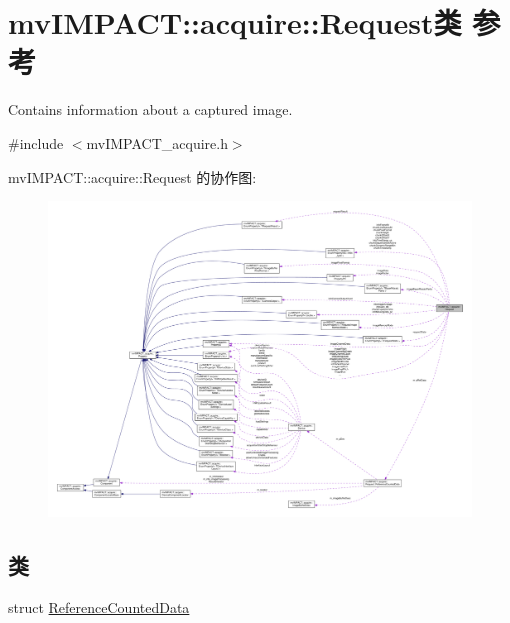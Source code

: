 \hypertarget{classmv_i_m_p_a_c_t_1_1acquire_1_1_request}{\section{mv\+I\+M\+P\+A\+C\+T\+:\+:acquire\+:\+:Request类 参考}
\label{classmv_i_m_p_a_c_t_1_1acquire_1_1_request}
}


Contains information about a captured image.  




{\ttfamily \#include $<$mv\+I\+M\+P\+A\+C\+T\+\_\+acquire.\+h$>$}



mv\+I\+M\+P\+A\+C\+T\+:\+:acquire\+:\+:Request 的协作图\+:
\nopagebreak
\begin{figure}[H]
\begin{center}
\leavevmode
\includegraphics[width=350pt]{classmv_i_m_p_a_c_t_1_1acquire_1_1_request__coll__graph}
\end{center}
\end{figure}
\subsection*{类}
\begin{DoxyCompactItemize}
\item 
struct \hyperlink{structmv_i_m_p_a_c_t_1_1acquire_1_1_request_1_1_reference_counted_data}{Reference\+Counted\+Data}
\end{DoxyCompactItemize}
